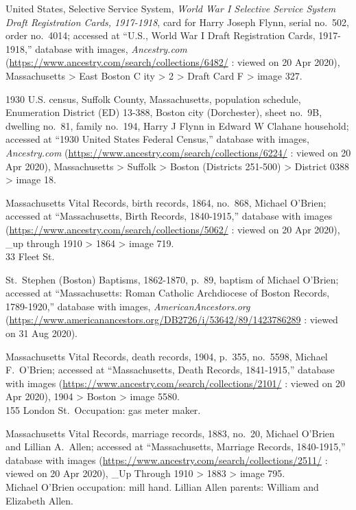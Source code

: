 \begin{thebibliography}{999}
	United States, Selective Service System, \textit{World War I Selective Service System Draft Registration Cards, 1917-1918}, card for Harry Joseph Flynn, serial no.\ 502, order no.\ 4014; accessed at ``U.S., World War I Draft Registration Cards, 1917-1918,'' database with images, \textit{Ancestry.com} (\url{https://www.ancestry.com/search/collections/6482/} : viewed on 20 Apr 2020), Massachusetts > East Boston C ity > 2 > Draft Card F > image 327.
	
	1930 U.S. census, Suffolk County, Massachusetts, population schedule, Enumeration District (ED) 13-388, Boston city (Dorchester), sheet no.\ 9B, dwelling no.\ 81, family no.\ 194, Harry J Flynn in Edward W Clahane household; accessed at ``1930 United States Federal Census,'' database with images, \textit{Ancestry.com} (\url{https://www.ancestry.com/search/collections/6224/} : viewed on 20 Apr 2020), Massachusetts > Suffolk > Boston (Districts 251-500) > District 0388 > image 18.
	
	Massachusetts Vital Records, birth records, 1864, no.\ 868, Michael O'Brien; accessed at ``Massachusetts, Birth Records, 1840-1915,'' database with images (\url{https://www.ancestry.com/search/collections/5062/} : viewed on 20 Apr 2020), \_up through 1910 > 1864 > image 719.\\
	33 Fleet St.
	
	St.\ Stephen (Boston) Baptisms, 1862-1870, p.\ 89, baptism of Michael O'Brien; accessed at ``Massachusetts: Roman Catholic Archdiocese of Boston Records, 1789-1920,'' database with images, \textit{AmericanAncestors.org} (\url{https://www.americanancestors.org/DB2726/i/53642/89/1423786289} : viewed on 31 Aug 2020).
	
	Massachusetts Vital Records, death records, 1904, p.\ 355, no.\ 5598, Michael F.\ O'Brien; accessed at ``Massachusetts, Death Records, 1841-1915,'' database with images (\url{https://www.ancestry.com/search/collections/2101/} : viewed on 20 Apr 2020), 1904 > Boston > image 5580.\\
	155 London St.\ Occupation: gas meter maker.
	
	Massachusetts Vital Records, marriage records, 1883, no.\ 20, Michael O'Brien and Lillian A.\ Allen; accessed at ``Massachusetts, Marriage Records, 1840-1915,'' database with images (\url{https://www.ancestry.com/search/collections/2511/} : viewed on 20 Apr 2020), \_Up Through 1910 > 1883 > image 795.\\
	Michael O'Brien occupation: mill hand. Lillian Allen parents: William and Elizabeth Allen.
	

\end{thebibliography}
